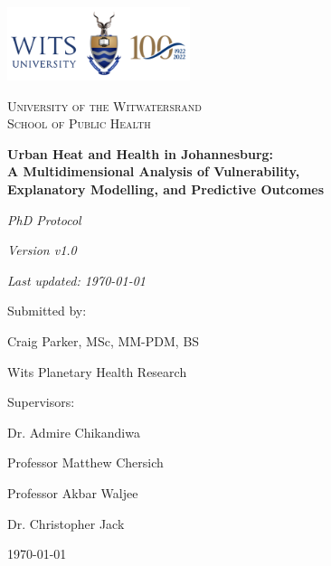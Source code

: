 \documentclass[12pt,a4paper]{article}
\newcommand{\protocolversion}{v1.0} %
\newcommand{\revisiondate}{\today} %
\begin{document}
\begin{titlepage}
    \thispagestyle{firstpage} %
    \centering
    \includegraphics[width=0.4\textwidth]{wits_logo.png}\\[1cm]
    
    {\scshape\LARGE University of the Witwatersrand \\
    School of Public Health \par}
    \vspace{1.5cm}
    
    {\huge\bfseries Urban Heat and Health in Johannesburg:\\
    A Multidimensional Analysis of Vulnerability, \\
    Explanatory Modelling, and Predictive Outcomes\par}
    \vspace{1.5cm}
    
    {\large\textit{PhD Protocol}\par}
    \vspace{0.5cm}
    
    {\normalsize\textit{Version \protocolversion}\par} %
    {\normalsize\textit{Last updated: \revisiondate}\par} %
    \vspace{0.5cm}
    
    {\large Submitted by:\par}
    {\Large Craig Parker, MSc, MM-PDM, BS\par}
    {\large Wits Planetary Health Research\par}
    \vspace{0.5cm}
    
    {\large Supervisors:\par}
    {\large Dr. Admire Chikandiwa\par}
    {\large Professor Matthew Chersich\par}
    {\large Professor Akbar Waljee\par}
    {\large Dr. Christopher Jack\par}
    \vfill
    
    {\large \today\par}
\end{titlepage}
\end{document}
